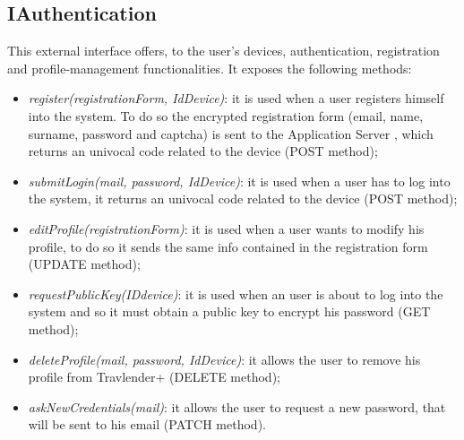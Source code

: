 \subsection{IAuthentication}
\label{subsect:IAuthentication}
This external interface offers, to the user's devices, authentication, registration and profile-management functionalities. It exposes the following methods:
\begin{itemize}
	\item \textit{register(registrationForm, IdDevice)}: it is used when a user registers himself into the system. To do so the encrypted registration form (email, name, surname, password and captcha) is sent to the Application Server , which returns an univocal code related to the device (POST method);
	\item \textit{submitLogin(mail, password, IdDevice)}: it is used when a user has to log into the system, it returns an univocal code related to the device (POST method);
	\item \textit{editProfile(registrationForm)}: it is used when a user wants to modify his profile, to do so it sends the same info contained in the registration form (UPDATE method);
	\item \textit{requestPublicKey(IDdevice)}: it is used when an user is about to log into the system and so it must obtain a public key to encrypt his password (GET method);
	\item \textit{deleteProfile(mail, password, IdDevice)}: it allows the user to remove his profile from Travlender+ (DELETE method);
	\item \textit{askNewCredentials(mail)}: it allows the user to request a new password, that will be sent to his email (PATCH method).
\end{itemize}

